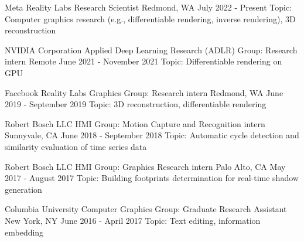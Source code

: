 
\begin{cventries}

  \cventry
	{Meta Reality Labs}
	{Research Scientist}
	{Redmond, WA}
	{July 2022 - Present}
	{Topic: Computer graphics research (e.g., differentiable rendering, inverse rendering), 3D reconstruction}

  \cventry
	{NVIDIA Corporation}
	{Applied Deep Learning Research (ADLR) Group: Research intern}
	{Remote}
	{June 2021 - November 2021}
	{Topic: Differentiable rendering on GPU}

  \cventry
  	{Facebook Reality Labs}
  	{Graphics Group: Research intern}
  	{Redmond, WA}
  	{June 2019 - September 2019}
  	{Topic: 3D reconstruction, differentiable rendering}

  \cventry
    {Robert Bosch LLC}
    {HMI Group: Motion Capture and Recognition intern}
    {Sunnyvale, CA}
    {June 2018 - September 2018}
    {Topic: Automatic cycle detection and similarity evaluation of time series data}

  \cventry
    {Robert Bosch LLC}
    {HMI Group: Graphics Research intern}
    {Palo Alto, CA}
    {May 2017 - August 2017}
    {Topic: Building footprints determination for real-time shadow generation}

  \cventry
    {Columbia University}
    {Computer Graphics Group: Graduate Research Assistant}
    {New York, NY}
    {June 2016 - April 2017}
    {Topic: Text editing, information embedding}

\end{cventries}
